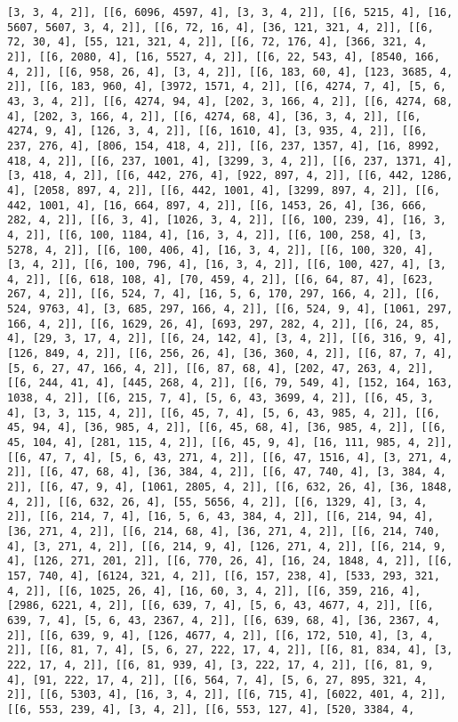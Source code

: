 \documentclass[12pt,fleqn]{article}\usepackage{../../common}
\begin{document}
\begin{verbatim}
[3, 3, 4, 2]], [[6, 6096, 4597, 4], [3, 3, 4, 2]], [[6, 5215, 4], [16, 5607, 5607, 3, 4, 2]], [[6, 72, 16, 4], [36, 121, 321, 4, 2]], [[6, 72, 30, 4], [55, 121, 321, 4, 2]], [[6, 72, 176, 4], [366, 321, 4, 2]], [[6, 2080, 4], [16, 5527, 4, 2]], [[6, 22, 543, 4], [8540, 166, 4, 2]], [[6, 958, 26, 4], [3, 4, 2]], [[6, 183, 60, 4], [123, 3685, 4, 2]], [[6, 183, 960, 4], [3972, 1571, 4, 2]], [[6, 4274, 7, 4], [5, 6, 43, 3, 4, 2]], [[6, 4274, 94, 4], [202, 3, 166, 4, 2]], [[6, 4274, 68, 4], [202, 3, 166, 4, 2]], [[6, 4274, 68, 4], [36, 3, 4, 2]], [[6, 4274, 9, 4], [126, 3, 4, 2]], [[6, 1610, 4], [3, 935, 4, 2]], [[6, 237, 276, 4], [806, 154, 418, 4, 2]], [[6, 237, 1357, 4], [16, 8992, 418, 4, 2]], [[6, 237, 1001, 4], [3299, 3, 4, 2]], [[6, 237, 1371, 4], [3, 418, 4, 2]], [[6, 442, 276, 4], [922, 897, 4, 2]], [[6, 442, 1286, 4], [2058, 897, 4, 2]], [[6, 442, 1001, 4], [3299, 897, 4, 2]], [[6, 442, 1001, 4], [16, 664, 897, 4, 2]], [[6, 1453, 26, 4], [36, 666, 282, 4, 2]], [[6, 3, 4], [1026, 3, 4, 2]], [[6, 100, 239, 4], [16, 3, 4, 2]], [[6, 100, 1184, 4], [16, 3, 4, 2]], [[6, 100, 258, 4], [3, 5278, 4, 2]], [[6, 100, 406, 4], [16, 3, 4, 2]], [[6, 100, 320, 4], [3, 4, 2]], [[6, 100, 796, 4], [16, 3, 4, 2]], [[6, 100, 427, 4], [3, 4, 2]], [[6, 618, 108, 4], [70, 459, 4, 2]], [[6, 64, 87, 4], [623, 267, 4, 2]], [[6, 524, 7, 4], [16, 5, 6, 170, 297, 166, 4, 2]], [[6, 524, 9763, 4], [3, 685, 297, 166, 4, 2]], [[6, 524, 9, 4], [1061, 297, 166, 4, 2]], [[6, 1629, 26, 4], [693, 297, 282, 4, 2]], [[6, 24, 85, 4], [29, 3, 17, 4, 2]], [[6, 24, 142, 4], [3, 4, 2]], [[6, 316, 9, 4], [126, 849, 4, 2]], [[6, 256, 26, 4], [36, 360, 4, 2]], [[6, 87, 7, 4], [5, 6, 27, 47, 166, 4, 2]], [[6, 87, 68, 4], [202, 47, 263, 4, 2]], [[6, 244, 41, 4], [445, 268, 4, 2]], [[6, 79, 549, 4], [152, 164, 163, 1038, 4, 2]], [[6, 215, 7, 4], [5, 6, 43, 3699, 4, 2]], [[6, 45, 3, 4], [3, 3, 115, 4, 2]], [[6, 45, 7, 4], [5, 6, 43, 985, 4, 2]], [[6, 45, 94, 4], [36, 985, 4, 2]], [[6, 45, 68, 4], [36, 985, 4, 2]], [[6, 45, 104, 4], [281, 115, 4, 2]], [[6, 45, 9, 4], [16, 111, 985, 4, 2]], [[6, 47, 7, 4], [5, 6, 43, 271, 4, 2]], [[6, 47, 1516, 4], [3, 271, 4, 2]], [[6, 47, 68, 4], [36, 384, 4, 2]], [[6, 47, 740, 4], [3, 384, 4, 2]], [[6, 47, 9, 4], [1061, 2805, 4, 2]], [[6, 632, 26, 4], [36, 1848, 4, 2]], [[6, 632, 26, 4], [55, 5656, 4, 2]], [[6, 1329, 4], [3, 4, 2]], [[6, 214, 7, 4], [16, 5, 6, 43, 384, 4, 2]], [[6, 214, 94, 4], [36, 271, 4, 2]], [[6, 214, 68, 4], [36, 271, 4, 2]], [[6, 214, 740, 4], [3, 271, 4, 2]], [[6, 214, 9, 4], [126, 271, 4, 2]], [[6, 214, 9, 4], [126, 271, 201, 2]], [[6, 770, 26, 4], [16, 24, 1848, 4, 2]], [[6, 157, 740, 4], [6124, 321, 4, 2]], [[6, 157, 238, 4], [533, 293, 321, 4, 2]], [[6, 1025, 26, 4], [16, 60, 3, 4, 2]], [[6, 359, 216, 4], [2986, 6221, 4, 2]], [[6, 639, 7, 4], [5, 6, 43, 4677, 4, 2]], [[6, 639, 7, 4], [5, 6, 43, 2367, 4, 2]], [[6, 639, 68, 4], [36, 2367, 4, 2]], [[6, 639, 9, 4], [126, 4677, 4, 2]], [[6, 172, 510, 4], [3, 4, 2]], [[6, 81, 7, 4], [5, 6, 27, 222, 17, 4, 2]], [[6, 81, 834, 4], [3, 222, 17, 4, 2]], [[6, 81, 939, 4], [3, 222, 17, 4, 2]], [[6, 81, 9, 4], [91, 222, 17, 4, 2]], [[6, 564, 7, 4], [5, 6, 27, 895, 321, 4, 2]], [[6, 5303, 4], [16, 3, 4, 2]], [[6, 715, 4], [6022, 401, 4, 2]], [[6, 553, 239, 4], [3, 4, 2]], [[6, 553, 127, 4], [520, 3384, 4, 
\end{verbatim}
\end{document}
